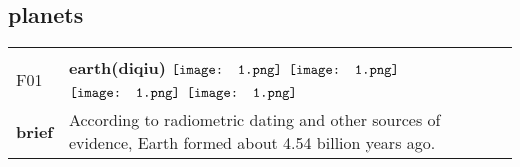 \documentclass[UTF8]{article}
\begin{document}
        \subsection{\Large planets}
    \vspace{-10pt}
            \begin{tabularx}{\textwidth}{p{1.5cm}X}
            \arrayrulecolor{myBlue}
        	\hline\\
            \small{F01}&
            \large{\bfseries{earth(diqiu)}}\hfill
                                                            \phantom{$\vcenter{\hbox{\texttt{[image: 1.png]}}}$}
                                                                \phantom{$\vcenter{\hbox{\texttt{[image: 1.png]}}}$}
                                                                $\vcenter{\hbox{\texttt{[image: 1.png]}}}$
                                                                $\vcenter{\hbox{\texttt{[image: 1.png]}}}$
                                                                \phantom{$\vcenter{\hbox{\texttt{[image: 1.png]}}}$}
                                                                $\vcenter{\hbox{\texttt{[image: 1.png]}}}$
                                                                $\vcenter{\hbox{\texttt{[image: 1.png]}}}$
                                        \\[10pt]
            \large{\bfseries{brief}}&\noindent\parbox[c]{\hsize}{According to radiometric dating and other sources of evidence, Earth formed about 4.54 billion years ago.} \\[5pt]
            \hline\\[-10pt]
        \end{tabularx}
\end{document}
